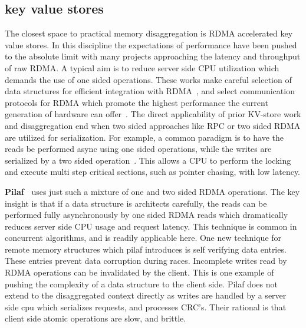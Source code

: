 \subsection{key value stores} 
The closest space to practical memory disaggregation is RDMA accelerated key
value stores. In this discipline the expectations of performance have been
pushed to the absolute limit with many projects approaching the latency and
throughput of raw RDMA. A typical aim is to reduce server side CPU utilization
which demands the use of one sided operations. These works make careful
selection of data structures for efficient integration with
RDMA~\cite{hopscotch,cuckoo}, and select communication protocols for RDMA which
promote the highest performance the current generation of hardware can
offer~\cite{herd,storm}. The direct applicability of prior KV-store work and
disaggregation end when two sided approaches like RPC or two sided RDMA are
utilized for serialization. For example, a common paradigm is to have the reads
be performed async using one sided operations, while the writes are serialized
by a two sided operation~\cite{pilaf}. This allows a CPU to perform the locking
and execute multi step critical sections, such as pointer chasing, with low
latency.

\textbf{Pilaf~\cite{pilaf}} uses just such a mixture of one and two sided RDMA
operations. The key insight is that if a data structure is architects carefully,
the reads can be performed fully asynchronously by one sided RDMA reads which
dramatically reduces server side CPU usage and request latency. This technique
is common in concurrent algorithms, and is readily applicable here. One new
technique for remote memory structures which pilaf introduces is self verifying
data entries. These entries prevent data corruption during races. Incomplete
writes read by RDMA operations can be invalidated by the client. This is one
example of pushing the complexity of a data structure to the client side. Pilaf
does not extend to the disaggregated context directly as writes are handled by a
server side cpu which serializes requests, and processes CRC's. Their rational
is that client side atomic operations are slow, and brittle. 


